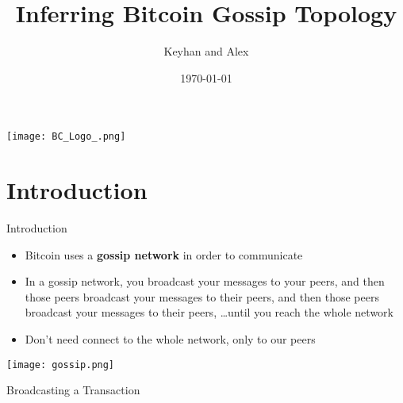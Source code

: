 \documentclass{beamer}
\title{Inferring Bitcoin Gossip Topology}
\author{Keyhan and Alex}
\institute{CS 261}
\date{\today}
\newcommand{\advat}[1]{\node (Adv) at #1 {$\color{red}{\bullet}$} ;}
\newcommand{\nodeat}[2]{\node (#1) at #2 {$\bullet$} ;}
\newcommand{\connect}[3][]{\draw[#1] (#2)--(#3) ;}
\newcommand{\inv}[4][above]{\draw[->] (#2)--(#4) node[midway,#1] {$\texttt{INV}$(#3)} ;}
\newcommand{\getdata}[4][above]{\draw[->] (#2)--(#4) node[midway,#1] {$\texttt{GETDATA}$(#3)} ;}
\newcommand{\tx}[4][above]{\draw[->] (#2)--(#4) node[midway,#1] {$\texttt{TX}$(#3)} ;}
\newcommand{\knows}[3][below]{\node[#1= 0.1 of #2] (#1-#2) {#3} ;}
\begin{document}
\begin{frame}
  \titlepage
  \begin{overlayarea}{0cm}{0cm}
  \begin{center}
  \vspace{-5cm}
      \texttt{[image: BC\_Logo\_.png]}
  \end{center}
  \end{overlayarea}
\end{frame}

\section{Introduction}

\begin{frame}{Introduction}

\begin{itemize}
  \item Bitcoin uses a \textbf{gossip network} in order to communicate \pause
  \item In a gossip network, you broadcast your messages to your peers, \pause and then those peers broadcast your messages to their peers, \pause and then those peers broadcast your messages to their peers, \ldots \pause until you reach the whole network \pause
  \item Don't need connect to the whole network, only to our peers\pause
\end{itemize}
\begin{center}
    \texttt{[image: gossip.png]}
\end{center}
\end{frame}

\begin{frame}{Broadcasting a Transaction}
\end{frame}
\end{document}
